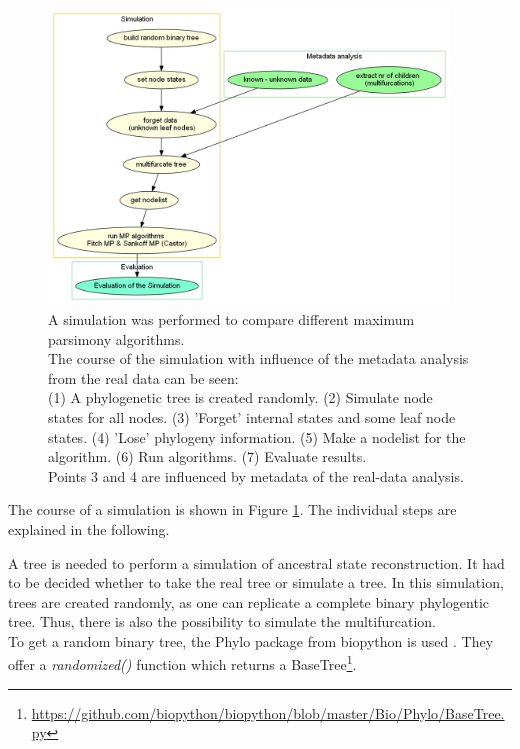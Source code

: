     \begin{figure}[h!]
      \centering
      \includegraphics[width=0.95\textwidth]{Figures/Workflow-Simulation.png}
      \caption{A simulation was performed to compare different maximum parsimony algorithms. \\
        The course of the simulation with influence of the metadata analysis from the real data can
          be seen: \\
        (1) A phylogenetic tree is created randomly. (2) Simulate node states for all nodes. (3) 
          'Forget' internal states and some leaf node states. (4) 'Lose' phylogeny information. (5) 
          Make a nodelist for the algorithm. (6) Run algorithms. (7) Evaluate results. \\
        Points 3 and 4 are influenced by metadata of the real-data analysis.}
      \label{fig:Simulation Workflow}
    \end{figure}
    The course of a simulation is shown in Figure \ref{fig:Simulation Workflow}. The individual steps 
      are explained in the following.

    A tree is needed to perform a simulation of ancestral state reconstruction. It had to be decided 
      whether to take the real tree or simulate a tree. In this simulation, trees are created randomly, 
      as one can replicate a complete binary phylogentic tree. Thus, there is also the possibility to 
      simulate the multifurcation. \\
    To get a random binary tree, the Phylo package from biopython is used \cite{Cock2009}. They offer 
      a \textit{randomized()} function which returns a BaseTree\footnote{
        \hyperlink{https://github.com/biopython/biopython/blob/master/Bio/Phylo/BaseTree.py}
        {https://github.com/biopython/biopython/blob/master/Bio/Phylo/BaseTree.py}
      }.

